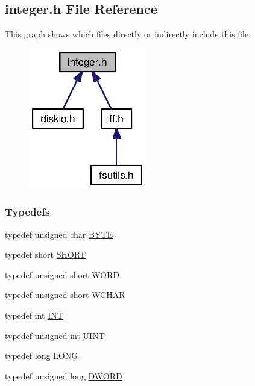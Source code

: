 \subsection{integer.\+h File Reference}
\label{integer_8h}
This graph shows which files directly or indirectly include this file\+:
\nopagebreak
\begin{figure}[H]
\begin{center}
\leavevmode
\includegraphics[width=145pt]{integer_8h__dep__incl}
\end{center}
\end{figure}
\subsubsection*{Typedefs}
\begin{DoxyCompactItemize}
\item 
typedef unsigned char \hyperlink{integer_8h_a4ae1dab0fb4b072a66584546209e7d58}{B\+Y\+T\+E}
\item 
typedef short \hyperlink{integer_8h_a9909bd3cf05f0906045f2ee85be4eeac}{S\+H\+O\+R\+T}
\item 
typedef unsigned short \hyperlink{integer_8h_a197942eefa7db30960ae396d68339b97}{W\+O\+R\+D}
\item 
typedef unsigned short \hyperlink{integer_8h_a570001c92f314285ad3e7139d8c58cf7}{W\+C\+H\+A\+R}
\item 
typedef int \hyperlink{integer_8h_a392e62da233ed3e2f7c3fd4f487a3896}{I\+N\+T}
\item 
typedef unsigned int \hyperlink{integer_8h_a36cb3b01d81ffd844bbbfb54003e06ec}{U\+I\+N\+T}
\item 
typedef long \hyperlink{integer_8h_a2a3e0cda5f1249bef6db47c5eb8e3813}{L\+O\+N\+G}
\item 
typedef unsigned long \hyperlink{integer_8h_ad342ac907eb044443153a22f964bf0af}{D\+W\+O\+R\+D}
\end{DoxyCompactItemize}


